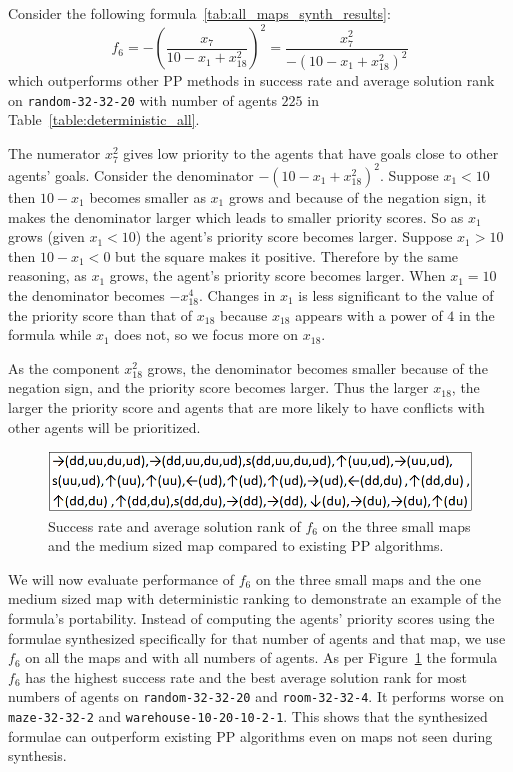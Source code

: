 \documentclass[letterpaper]{article}
\begin{document}
Consider the following formula~\ref{tab:all_maps_synth_results}: $$ f_{6} =-\left(\frac{x_{7}}{10 - x_{1} + x_{18}^2}\right)^2 = \frac{x_{7}^2}{-(10 - x_{1} + x_{18}^2)^2} $$ which outperforms other PP methods in success rate and average solution rank on {\tt random-32-32-20} with number of agents $ 225 $ in Table~\ref{table:deterministic_all}.

The numerator $ x_7^2 $ gives low priority to the agents that have goals close to other agents' goals. Consider the denominator $ -(10 - x_{1} + x_{18}^2)^2 $. Suppose $ x_{1} < 10 $ then $ 10 - x_1 $ becomes smaller as $ x_1 $ grows and because of the negation sign, it makes the denominator larger which leads to smaller priority scores. So as $ x_1 $ grows (given $ x_1 < 10 $) the agent's priority score becomes larger. Suppose $ x_1 > 10 $ then $ 10 - x_1 < 0 $ but the square makes it positive. Therefore by the same reasoning, as $ x_1 $ grows, the agent's priority score becomes larger. When $ x_1 = 10 $ the denominator becomes $ -x_{18}^4 $. Changes in $ x_1 $ is less significant to the value of the priority score than that of $ x_{18} $ because $ x_{18} $ appears with a power of $ 4 $ in the formula while $ x_1 $ does not, so we focus more on $ x_{18} $.

As the component $ x_{18}^2 $ grows, the denominator becomes smaller because of the negation sign, and the priority score becomes larger. Thus the larger $ x_{18} $, the larger the priority score and agents that are more likely to have conflicts with other agents will be prioritized.

\begin{figure}[t!]
\centering
\includegraphics[width=1.0\columnwidth]{figs/succRankPortability.png}
\caption{Success rate and average solution rank of $ f_{6} $ on the three small maps and the medium sized map compared to existing PP algorithms.}
\label{fig:portability}
\end{figure}

We will now evaluate performance of $ f_{6} $ on the three small maps and the one medium sized map with deterministic ranking to demonstrate an example of the formula's portability. Instead of computing the agents' priority scores using the formulae synthesized specifically for that number of agents and that map, we use $ f_6 $ on all the maps and with all numbers of agents. As per Figure~\ref{fig:portability} the formula $ f_6 $ has the highest success rate and the best average solution rank for most numbers of agents on {\tt random-32-32-20} and {\tt room-32-32-4}. It performs worse on {\tt maze-32-32-2} and {\tt warehouse-10-20-10-2-1}. This shows that the synthesized formulae can outperform existing PP algorithms even on maps not seen during synthesis.
\end{document}
